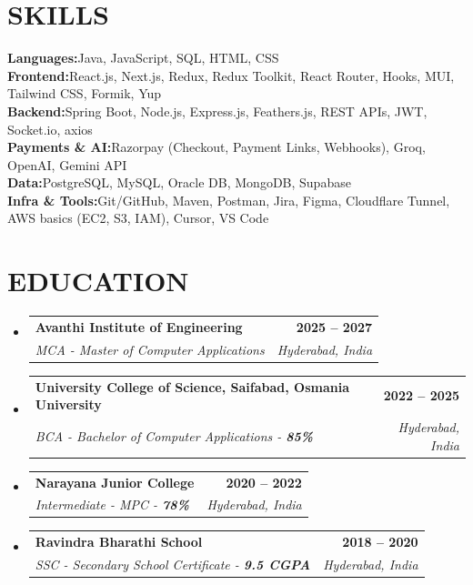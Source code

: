 \documentclass[letterpaper,11pt]{article}
\makeatletter
\newcommand{\resumeSubheading}[4]{
  \vspace{-2pt}\item
    \begin{tabular*}{1.0\textwidth}[t]{l@{\extracolsep{\fill}}r}
      \textbf{\large#1} & \textbf{\small #2} \\
      \textit{\large#3} & \textit{\small #4} \\
    \end{tabular*}\vspace{-7pt}
}
\newcommand{\resumeSubHeadingListStart}{\begin{itemize}[leftmargin=0.0in, label={}]}
\newcommand{\resumeSubHeadingListEnd}{\end{itemize}}
\makeatother
\begin{document}
\section{SKILLS}
\begin{itemize}[leftmargin=0.1in, label={}]
    \small{\item{
     \textbf{\normalsize{Languages:}}{\normalsize Java, JavaScript, SQL, HTML, CSS} \\
     \textbf{\normalsize{Frontend:}}{\normalsize React.js, Next.js, Redux, Redux Toolkit, React Router, Hooks, MUI, Tailwind CSS, Formik, Yup} \\
     \textbf{\normalsize{Backend:}}{\normalsize Spring Boot, Node.js, Express.js, Feathers.js, REST APIs, JWT, Socket.io, axios} \\
     \textbf{\normalsize{Payments \& AI:}}{\normalsize Razorpay (Checkout, Payment Links, Webhooks), Groq, OpenAI, Gemini API} \\
     \textbf{\normalsize{Data:}}{\normalsize PostgreSQL, MySQL, Oracle DB, MongoDB, Supabase} \\
     \textbf{\normalsize{Infra \& Tools:}}{\normalsize Git/GitHub, Maven, Postman, Jira, Figma, Cloudflare Tunnel, AWS basics (EC2, S3, IAM), Cursor, VS Code}
    }}
\end{itemize}
\vspace{-12pt}

\section{EDUCATION}
\resumeSubHeadingListStart
\resumeSubheading
    {Avanthi Institute of Engineering}{2025 -- 2027}
    {MCA - Master of Computer Applications}{Hyderabad, India}
\resumeSubheading
    {University College of Science, Saifabad, Osmania University}{2022 -- 2025}
    {BCA - Bachelor of Computer Applications - \textbf{85\%}}{Hyderabad, India}
\resumeSubheading
    {Narayana Junior College}{2020 -- 2022}
    {Intermediate - MPC - \textbf{78\%}}{Hyderabad, India}
\resumeSubheading
    {Ravindra Bharathi School}{2018 -- 2020}
    {SSC - Secondary School Certificate - \textbf{9.5 CGPA}}{Hyderabad, India}
\resumeSubHeadingListEnd
\end{document}
